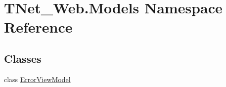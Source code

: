 \hypertarget{namespace_t_net___web_1_1_models}{}\section{T\+Net\+\_\+\+Web.\+Models Namespace Reference}
\label{namespace_t_net___web_1_1_models}
\subsection*{Classes}
\begin{DoxyCompactItemize}
\item 
class \mbox{\hyperlink{class_t_net___web_1_1_models_1_1_error_view_model}{Error\+View\+Model}}
\end{DoxyCompactItemize}
